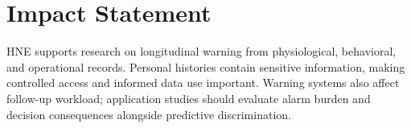 \documentclass{article}
\begin{document}





\section*{Impact Statement}
HNE supports research on longitudinal warning from physiological, behavioral, and operational records. Personal histories contain sensitive information, making controlled access and informed data use important. Warning systems also affect follow-up workload; application studies should evaluate alarm burden and decision consequences alongside predictive discrimination.




\appendix
{}
\renewcommand{\contentsname}{Appendix Contents}
\noindent\begin{minipage}{\columnwidth}
\tableofcontents
\end{minipage}\par






\end{document}
